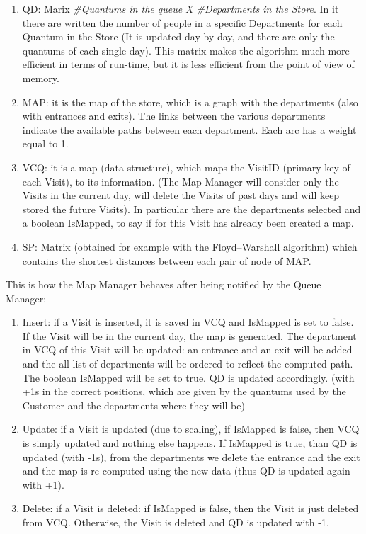 \documentclass[a4paper, 12pt, oneside, table]{article}
\begin{document}
\begin{enumerate}
    \item QD: Marix \textit{\#Quantums in the queue X \#Departments in the Store}. In it there are written the number of people in a specific Departments for each Quantum in the Store (It is updated day by day, and there are only the quantums of each single day). This matrix makes the algorithm much more efficient in terms of run-time, but it is less efficient from the point of view of memory.
    \item MAP: it is the map of the store, which is a graph with the departments (also with entrances and exits). The links between the various departments indicate the available paths between each department. Each arc has a weight equal to 1.
    \item VCQ: it is a map (data structure), which maps the VisitID (primary key of each Visit), to its information. (The Map Manager will consider only the Visits in the current day, will delete the Visits of past days and will keep stored the future Visits). In particular there are the departments selected and a boolean IsMapped, to say if for this Visit has already been created a map.
    \item SP: Matrix (obtained for example with the Floyd–Warshall algorithm) which contains the shortest distances between each pair of node of MAP.
\end{enumerate}
This is how the Map Manager behaves after being notified by the Queue Manager:
\begin{enumerate}
    \item Insert: if a Visit is inserted, it is saved in VCQ and IsMapped is set to false. If the Visit will be in the current day, the map is generated. The department in VCQ of this Visit will be updated: an entrance and an exit will be added and the all list of departments will be ordered to reflect the computed path. The boolean IsMapped will be set to true. QD is updated accordingly. (with +1s in the correct positions, which are given by the quantums used by the Customer and the departments where they will be)
    \item Update: if a Visit is updated (due to scaling), if IsMapped is false, then VCQ is simply updated and nothing else happens. If IsMapped is true, than QD is updated (with -1s), from the departments we delete the entrance and the exit and the map is re-computed using the new data (thus QD is updated again with +1).
    \item Delete: if a Visit is deleted: if IsMapped is false, then the Visit is just deleted from VCQ. Otherwise, the Visit is deleted and QD is updated with -1.
\end{enumerate}
\end{document}
